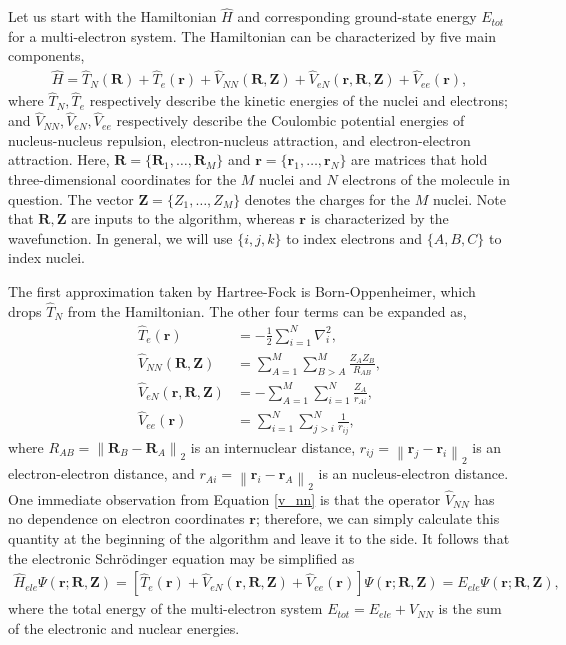 \documentclass[12pt]{article}
\newcommand{\vect}[1]{\boldsymbol{#1}}
\newcommand{\norm}[1]{\left\lVert#1\right\rVert}
\begin{document}
Let us start with the Hamiltonian $\hat{H}$ and corresponding ground-state energy $E_{tot}$ for a multi-electron system.  The Hamiltonian can be characterized by five main components,
\begin{align}
\hat{H} = \hat{T}_N(\vect{R}) + \hat{T}_e(\vect{r}) + \hat{V}_{NN}(\vect{R}, \vect{Z}) + \hat{V}_{eN}(\vect{r}, \vect{R}, \vect{Z}) + \hat{V}_{ee}(\vect{r}),
\end{align}
where $\hat{T}_N, \hat{T}_e$ respectively describe the kinetic energies of the nuclei and electrons; and $\hat{V}_{NN}, \hat{V}_{eN}, \hat{V}_{ee}$ respectively describe the Coulombic potential energies of nucleus-nucleus repulsion, electron-nucleus attraction, and electron-electron attraction.  Here, $\vect{R} = \{\vect{R}_1, \ldots, \vect{R}_M\}$ and $\vect{r} = \{\vect{r}_1, \ldots, \vect{r}_N\}$ are matrices that hold three-dimensional coordinates for the $M$ nuclei and $N$ electrons of the molecule in question.  The vector $\vect{Z} = \{Z_1, \ldots, Z_M\}$ denotes the charges for the $M$ nuclei.  Note that $\vect{R}, \vect{Z}$ are inputs to the algorithm, whereas $\vect{r}$ is characterized by the wavefunction.  In general, we will use $\{i, j, k\}$ to index electrons and $\{A, B, C\}$ to index nuclei.     

The first approximation taken by Hartree-Fock is Born-Oppenheimer, which drops $\hat{T}_N$ from the Hamiltonian.  The other four terms can be expanded as,
\begin{align}
\hat{T}_e(\vect{r}) &= -\frac{1}{2} \sum_{i=1}^N \nabla_i^2 \label{t_e} , \\
\hat{V}_{NN}(\vect{R}, \vect{Z}) &= \sum_{A=1}^M \sum_{B > A}^M \frac{Z_A Z_B}{R_{AB}} \label{v_nn},\\
\hat{V}_{eN}(\vect{r}, \vect{R}, \vect{Z}) &=  - \sum_{A=1}^M \sum_{i=1}^N \frac{Z_{A}}{r_{Ai}} \label{v_en}, \\
\hat{V}_{ee}(\vect{r}) &= \sum_{i=1}^N \sum_{j > i}^N \frac{1}{r_{ij}} \label{v_ee}, 
\end{align}      
where $R_{AB} = \norm{\vect{R}_B - \vect{R}_A}_2$ is an internuclear distance, $r_{ij} = \norm{\vect{r}_j - \vect{r}_i}_2$ is an electron-electron distance, and $r_{Ai} = \norm{\vect{r}_i - \vect{r}_A}_2$ is an nucleus-electron distance.  One immediate observation from Equation \ref{v_nn} is that the operator $\hat{V}_{NN}$ has no dependence on electron coordinates $\vect{r}$; therefore, we can simply calculate this quantity at the beginning of the algorithm and leave it to the side.  It follows that the electronic Schr\"odinger equation may be simplified as 
\begin{align}
\hat{H}_{ele} \Psi(\vect{r}; \vect{R}, \vect{Z}) = \left[ \hat{T}_e(\vect{r}) + \hat{V}_{eN}(\vect{r}, \vect{R}, \vect{Z}) + \hat{V}_{ee}(\vect{r}) \right] \Psi(\vect{r}; \vect{R}, \vect{Z})= E_{ele} \Psi(\vect{r}; \vect{R}, \vect{Z}) \label{H_ele},
\end{align}
where the total energy of the multi-electron system $E_{tot} = E_{ele} + V_{NN}$ is the sum of the electronic and nuclear energies.
\end{document}
